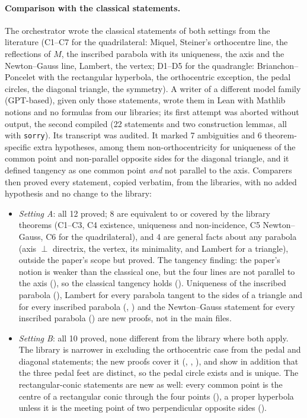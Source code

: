 \documentclass[11pt]{article}
\theoremstyle{definition}
\theoremstyle{remark}
\newcommand{\lean}[1]{\texttt{#1}}
\begin{document}
\paragraph{Comparison with the classical statements.} The orchestrator wrote the classical statements
of both settings from the literature (C1--C7 for the quadrilateral: Miquel, Steiner's orthocentre line,
the reflections of $M$, the inscribed parabola with its uniqueness, the axis and the Newton--Gauss
line, Lambert, the vertex; D1--D5 for the quadrangle: Brianchon--Poncelet with the rectangular
hyperbola, the orthocentric exception, the pedal circles, the diagonal triangle, the symmetry). A writer
of a different model family (GPT-based), given only those statements, wrote them in Lean with Mathlib
notions and no formulas from our libraries; its first attempt was aborted without output, the second
compiled (22 statements and two construction lemmas, all with \lean{sorry}). Its transcript was
audited. It marked 7 ambiguities and 6 theorem-specific extra hypotheses, among them non-orthocentricity
for uniqueness of the common point and non-parallel opposite sides for the diagonal triangle, and it
defined tangency as one common point \emph{and} not parallel to the axis. Comparers then proved every
statement, copied verbatim, from the libraries, with no added hypothesis and no change to the library:
\begin{itemize}
\item \emph{Setting A}: all 12 proved; 8 are equivalent to or covered by the library theorems (C1--C3,
C4 existence, uniqueness and non-incidence, C5 Newton--Gauss, C6 for the quadrilateral), and 4 are
general facts about any parabola (axis $\perp$ directrix, the vertex, its minimality, and Lambert for a
triangle), outside the paper's scope but proved. The tangency finding: the paper's notion is weaker than
the classical one, but the four lines are not parallel to the axis (),
so the classical tangency holds (). Uniqueness of the inscribed parabola
(), Lambert for every parabola tangent to the sides of a triangle and for
every inscribed parabola (, ) and the
Newton--Gauss statement for every inscribed parabola () are new proofs, not
in the main files.
\item \emph{Setting B}: all 10 proved, none different from the library where both apply. The library is
narrower in excluding the orthocentric case from the pedal and diagonal statements; the new proofs
cover it (, , ), and
show in addition that the three pedal feet are distinct, so the pedal circle exists and is unique. The
rectangular-conic statements are new as well: every common point is the centre of a rectangular conic
through the four points (), a proper hyperbola unless it is the meeting
point of two perpendicular opposite sides ().
\end{itemize}
\end{document}
